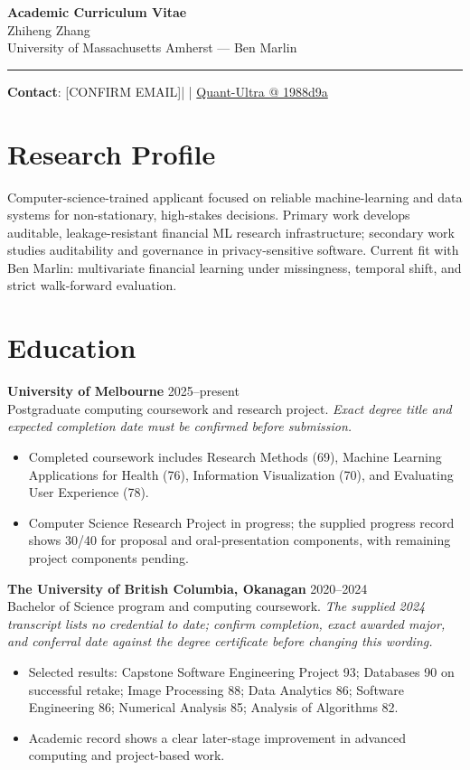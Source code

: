 \documentclass[11pt]{article}
\makeatletter
\newcommand{\ApplicantName}{Zhiheng Zhang}
\newcommand{\ApplicantEmail}{[CONFIRM EMAIL]}
\newcommand{\ApplicantPhone}{[CONFIRM PHONE]}
\newcommand{\ApplicantGitHub}{\href{https://github.com/zhiheng-zhang-Mera/Quant-Ultra/tree/1988d9a8530da91a8158de864d098ea869098923}{Quant-Ultra @ 1988d9a}}
\makeatother
\begin{document}
\begin{center}
{\LARGE\bfseries Academic Curriculum Vitae}\\[0.25em]
{\large \ApplicantName}\\
University of Massachusetts Amherst --- Ben Marlin
\end{center}
\vspace{0.35em}\hrule\vspace{0.65em}

\textbf{Contact}: \ApplicantEmail\quad | \quad \ApplicantPhone\quad | \quad \ApplicantGitHub

\section*{Research Profile}
Computer-science-trained applicant focused on reliable machine-learning and data systems for non-stationary, high-stakes decisions. Primary work develops auditable, leakage-resistant financial ML research infrastructure; secondary work studies auditability and governance in privacy-sensitive software. Current fit with Ben Marlin: multivariate financial learning under missingness, temporal shift, and strict walk-forward evaluation.

\section*{Education}
\textbf{University of Melbourne} \hfill 2025--present\\
Postgraduate computing coursework and research project. \textit{Exact degree title and expected completion date must be confirmed before submission.}
\begin{itemize}
\item Completed coursework includes Research Methods (69), Machine Learning Applications for Health (76), Information Visualization (70), and Evaluating User Experience (78).
\item Computer Science Research Project in progress; the supplied progress record shows 30/40 for proposal and oral-presentation components, with remaining project components pending.
\end{itemize}

\textbf{The University of British Columbia, Okanagan} \hfill 2020--2024\\
Bachelor of Science program and computing coursework. \textit{The supplied 2024 transcript lists no credential to date; confirm completion, exact awarded major, and conferral date against the degree certificate before changing this wording.}
\begin{itemize}
\item Selected results: Capstone Software Engineering Project 93; Databases 90 on successful retake; Image Processing 88; Data Analytics 86; Software Engineering 86; Numerical Analysis 85; Analysis of Algorithms 82.
\item Academic record shows a clear later-stage improvement in advanced computing and project-based work.
\end{itemize}
\end{document}
